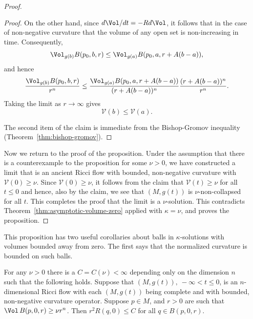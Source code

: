 \begin{proof}
\begin{proof}
On the other hand, since $d\Vol/dt=-Rd\Vol$, it follows
that in the case of non-negative curvature that the volume of any
open set is non-increasing in time. Consequently,
$$\Vol_{g(b)}B(p_0,b,r)\le
\Vol_{g(a)}B(p_0,a,r+A(b-a)),$$ and hence
$$\frac{\Vol_{g(b)}B(p_0,b,r)}{r^n}\le\frac{\Vol_{g(a)}B(p_0,a,r+A(b-a))}{(r+A(b-a))^n}\frac{(r+A(b-a))^n}{r^n}.$$
Taking the limit as $r\rightarrow \infty$ gives
$${\mathcal V}(b)\le {\mathcal V}(a).$$

The second item of the claim is immediate from the Bishop-Gromov
inequality (Theorem~\ref{thm:bishop-gromov}).
\end{proof}

Now we return to the proof of the proposition. Under the assumption
that there is a counterexample to the proposition for some $\nu>0$,
we have constructed a limit that is an ancient Ricci flow with
bounded, non-negative curvature with ${\mathcal V}(0)\ge \nu$. Since
${\mathcal V}(0)\ge \nu$, it follows from the claim that ${\mathcal
V}(t)\ge \nu$ for all $t\le 0$ and hence, also by the claim,  we see
that $(M,g(t))$ is $\nu$-non-collapsed for all $t$. This completes
the proof that the limit is a $\nu$-solution. This contradicts
Theorem~\ref{thm:asymptotic-volume-zero} applied with $\kappa=\nu$, and proves the
proposition.
\end{proof}

This proposition has two useful corollaries about balls in
$\kappa$-solutions with volumes bounded away from zero. The first
says that the normalized curvature is bounded on such balls.

\begin{corollary}\label{cor:volume-bound-implies-curvature-bound}
\label{bdvolbdcurv}
For any $\nu>0$ there is a $C=C(\nu)<\infty$ depending only on the
dimension $n$ such that the following holds. Suppose that
$(M,g(t)),\ -\infty<t\le 0$, is an $n$-dimensional Ricci flow with
each $(M,g(t))$ being complete and with bounded, non-negative
curvature operator. Suppose $p\in M$, and $r>0$ are such that
$\Vol\,B(p,0,r)\ge \nu r^n$. Then $r^2R(q,0)\le C$ for all $q\in
B(p,0,r)$.
\end{corollary}

